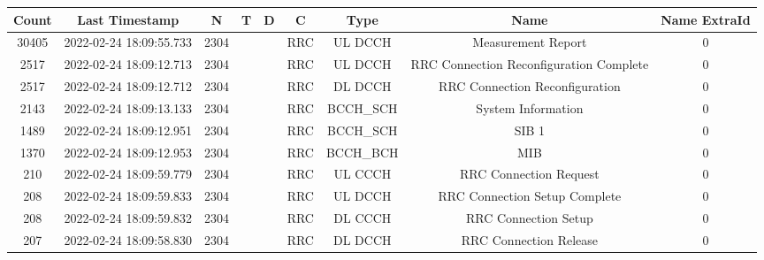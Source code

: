 \begin{longtable*}{|c|c|c|c|c|c|c|c|c|}\hline
{}
Count&Last Timestamp&N&T&D&C&Type&Name&Name ExtraId\\\hline\hline
{}30405&2022-02-24 18:09:55.733&2304&&&RRC&UL DCCH&Measurement Report&0\\\hline
{}2517&2022-02-24 18:09:12.713&2304&&&RRC&UL DCCH&RRC Connection Reconfiguration Complete&0\\\hline
{}2517&2022-02-24 18:09:12.712&2304&&&RRC&DL DCCH&RRC Connection Reconfiguration&0\\\hline
{}2143&2022-02-24 18:09:13.133&2304&&&RRC&BCCH\_SCH&System Information&0\\\hline
{}1489&2022-02-24 18:09:12.951&2304&&&RRC&BCCH\_SCH&SIB 1&0\\\hline
{}1370&2022-02-24 18:09:12.953&2304&&&RRC&BCCH\_BCH&MIB&0\\\hline
{}210&2022-02-24 18:09:59.779&2304&&&RRC&UL CCCH&RRC Connection Request&0\\\hline
{}208&2022-02-24 18:09:59.833&2304&&&RRC&UL DCCH&RRC Connection Setup Complete&0\\\hline
{}208&2022-02-24 18:09:59.832&2304&&&RRC&DL CCCH&RRC Connection Setup&0\\\hline
{}207&2022-02-24 18:09:58.830&2304&&&RRC&DL DCCH&RRC Connection Release&0\\\hline

\end{longtable*}
